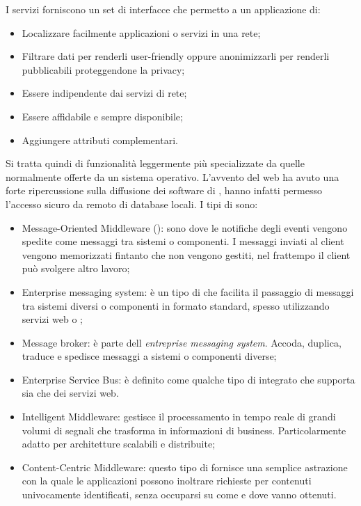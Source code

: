 	I servizi  forniscono un set di interfacce che permetto a un applicazione di:
	
	\begin{itemize}
		\item Localizzare facilmente applicazioni o servizi in una rete;
		\item Filtrare dati per renderli user-friendly oppure anonimizzarli per renderli pubblicabili proteggendone la privacy;
		\item Essere indipendente dai servizi di rete;
		\item Essere affidabile e sempre disponibile;
		\item Aggiungere attributi complementari.
	\end{itemize}
	
	Si tratta quindi di funzionalità leggermente più specializzate da quelle normalmente offerte da un sistema operativo. 
	L'avvento del web ha avuto una forte ripercussione sulla diffusione dei software di , hanno infatti permesso l'accesso sicuro da remoto di database locali.
	I tipi di  sono:
	
	\begin{itemize}
		\item Message-Oriented Middleware (): sono  dove le notifiche degli eventi vengono spedite come messaggi tra sistemi o componenti. I messaggi inviati al client vengono memorizzati fintanto che non vengono gestiti, nel frattempo il client può svolgere altro lavoro;
		\item Enterprise messaging system: è un tipo di  che facilita il passaggio di messaggi tra sistemi diversi o componenti in formato standard, spesso utilizzando servizi web o ;
		\item Message broker: è parte dell \emph{entreprise messaging system}. Accoda, duplica, traduce e spedisce messaggi a sistemi o componenti diverse;
		\item Enterprise Service Bus: è definito come qualche tipo di  integrato che supporta sia  che dei servizi web.
		\item Intelligent Middleware: gestisce il processamento in tempo reale di grandi volumi di segnali che trasforma in informazioni di business. Particolarmente adatto per architetture scalabili e distribuite;
		\item Content-Centric Middleware: questo tipo di  fornisce una semplice astrazione con la quale le applicazioni possono inoltrare richieste per contenuti univocamente identificati, senza occuparsi su come e dove vanno ottenuti.
		
	\end{itemize}	 
	
